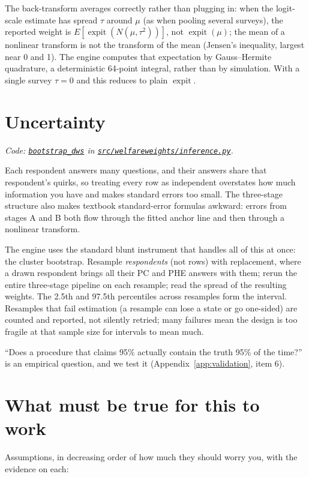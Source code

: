 \documentclass[11pt]{article}
\newcommand{\repo}{https://github.com/welfareweights/engine}
\newcommand{\src}[1]{\href{\repo/blob/main/#1}{\texttt{#1}}}
\newcommand{\fn}[1]{\href{https://github.com/search?q=repo\%3Awelfareweights\%2Fengine+symbol\%3A#1\&type=code}{\texttt{#1}}}
\newcommand{\expit}{\operatorname{expit}}
\begin{document}
The back-transform averages correctly rather than plugging in: when the logit-scale estimate has spread $\tau$ around $\mu$ (as when pooling several surveys), the reported weight is $E[\expit(N(\mu,\tau^2))]$, not $\expit(\mu)$; the mean of a nonlinear transform is not the transform of the mean (Jensen's inequality, largest near 0 and 1). The engine computes that expectation by Gauss--Hermite quadrature, a deterministic 64-point integral, rather than by simulation. With a single survey $\tau=0$ and this reduces to plain $\expit$.

\section{Uncertainty}

\emph{Code: \fn{bootstrap\_dws} in \src{src/welfareweights/inference.py}.}

Each respondent answers many questions, and their answers share that respondent's quirks, so treating every row as independent overstates how much information you have and makes standard errors too small. The three-stage structure also makes textbook standard-error formulas awkward: errors from stages A and B both flow through the fitted anchor line and then through a nonlinear transform.

The engine uses the standard blunt instrument that handles all of this at once: the cluster bootstrap. Resample \emph{respondents} (not rows) with replacement, where a drawn respondent brings all their PC and PHE answers with them; rerun the entire three-stage pipeline on each resample; read the spread of the resulting weights. The 2.5th and 97.5th percentiles across resamples form the interval. Resamples that fail estimation (a resample can lose a state or go one-sided) are counted and reported, not silently retried; many failures mean the design is too fragile at that sample size for intervals to mean much.

``Does a procedure that claims 95\% actually contain the truth 95\% of the time?'' is an empirical question, and we test it (Appendix~\ref{app:validation}, item 6).

\section{What must be true for this to work}

Assumptions, in decreasing order of how much they should worry you, with the evidence on each:
\end{document}
